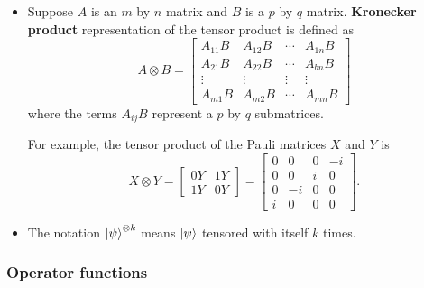 \documentclass{article}
\begin{document}
\begin{itemize}
  \item Suppose $A$ is an $m$ by $n$ matrix and $B$ is a $p$ by $q$ matrix. \textbf{Kronecker product} representation of the tensor product is defined as \[A \otimes B = \begin{bmatrix}
            A_{1 1} B & A_{1 2} B & \cdots & A_{1 n} B \\
            A_{2 1} B & A_{2 2} B & \cdots & A_{b n} B \\
            \vdots    & \vdots    & \vdots & \vdots    \\
            A_{m 1} B & A_{m 2} B & \cdots & A_{m n} B
          \end{bmatrix}\] where the terms $A_{i j} B$ represent a $p$ by $q$ submatrices.

        For example, the tensor product of the Pauli matrices $X$ and $Y$ is \[X \otimes Y = \begin{bmatrix}
            0 Y & 1 Y \\
            1 Y & 0 Y
          \end{bmatrix} = \begin{bmatrix}
            0 & 0  & 0 & -i \\
            0 & 0  & i & 0  \\
            0 & -i & 0 & 0  \\
            i & 0  & 0 & 0
          \end{bmatrix}.\]

  \item The notation $\ket{\psi}^{\otimes k}$ means $\ket{\psi}$ tensored with itself $k$ times.
\end{itemize}

\subsubsection{Operator functions}
\end{document}
